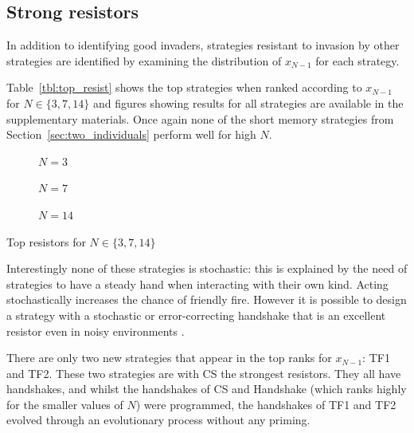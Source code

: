 \documentclass[10pt,journal]{IEEEtran}
\begin{document}
\subsection{Strong resistors}\label{sec:strong_resistors}

In addition to identifying good invaders, strategies resistant to invasion by
other strategies are identified by examining the distribution of $x_{N-1}$ for
each strategy.

Table~\ref{tbl:top_resist} shows the top strategies when ranked
according to \(x_{N-1}\) for \(N\in\{3, 7, 14\}\) and figures showing results
for all strategies are available in the supplementary materials.
Once again none of the short memory strategies from
Section~\ref{sec:two_individuals} perform well for high \(N\).

\begin{table}[!hbtp]
    \tiny
    \centering
    \begin{subfigure}[t]{\columnwidth}
        \centering
        
        \caption{\(N=3\)}
    \end{subfigure}%

    \begin{subfigure}[t]{\columnwidth}
        \centering
        
        \caption{\(N=7\)}
    \end{subfigure}

    \begin{subfigure}[t]{\columnwidth}
        \centering
        
        \caption{\(N=14\)}
    \end{subfigure}
    \caption{Top resistors for \(N\in\{3, 7, 14\}\)}
    \label{tbl:top_resist}
\end{table}

Interestingly none of these strategies is stochastic: this is explained by
the need of strategies to have a steady hand when interacting with their own
kind. Acting stochastically increases the chance of friendly fire.
However it is possible to design a strategy with a stochastic or error-correcting
handshake that is an excellent resistor even in noisy environments \cite{Lee2015}.

There are only two new strategies that appear in the top ranks for
\(x_{N-1}\): TF1 and TF2. These two strategies are with CS the strongest
resistors. They all have handshakes, and whilst the handshakes of CS and
Handshake (which ranks highly for the smaller values of \(N\)) were
programmed, the handshakes of TF1 and TF2 evolved through an evolutionary
process without any priming.
\end{document}
